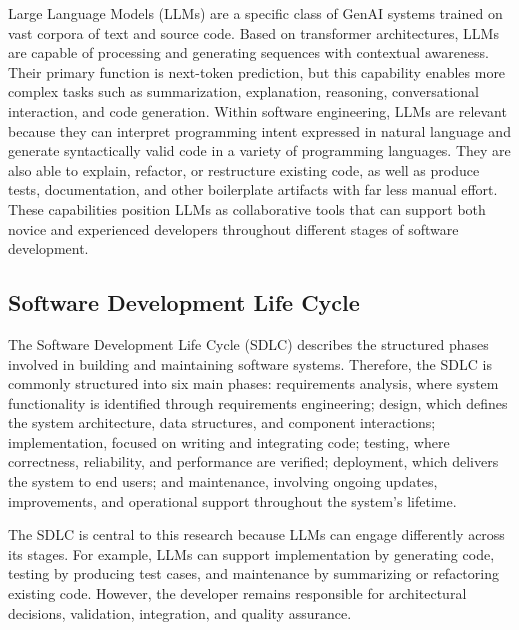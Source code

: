 Large Language Models (LLMs) are a specific class of GenAI systems trained on vast corpora of text and source code. Based on transformer architectures, LLMs are capable of processing and generating sequences with contextual awareness. Their primary function is next-token prediction, but this capability enables more complex tasks such as summarization, explanation, reasoning, conversational interaction, and code generation. Within software engineering, LLMs are relevant because they can interpret programming intent expressed in natural language and generate syntactically valid code in a variety of programming languages. They are also able to explain, refactor, or restructure existing code, as well as produce tests, documentation, and other boilerplate artifacts with far less manual effort. These capabilities position LLMs as collaborative tools that can support both novice and experienced developers throughout different stages of software development. \cite{Ahmed:2025ai,AlHashimi:2025er, Bai:2025ci, Banh:2025cf, Basha:2025tt, Chen:2025es, Dong:2024sc, Durrani:2024ad, Farhanna:2025eu, Gao:2025cc, Han:2025mg, Haque:2025la, Hemmat:2025rd, Hou:2025cl, J.Pries-Heje:2008SD, Jabrw:2025ss, Jensen:2025me, KarlovsKarlovskis:2024ga, Kim:2025ao, Kim:2025is, Li:2025sc, Moore:2025vc, Pendyala:2025pi, Qiu:2025ft, Ramos:2025aa, Terragni:2025fa, Tkachuk:2025dc, Wang:2025rs, Weyssow:2025ep, Yoo:2025sa, Zamfiroiu:2025ec, Zhang:2025ea}

\subsection{Software Development Life Cycle}

The Software Development Life Cycle (SDLC) describes the structured phases involved in building and maintaining software systems. Therefore, the SDLC is commonly structured into six main phases: requirements analysis, where system functionality is identified through requirements engineering; design, which defines the system architecture, data structures, and component interactions; implementation, focused on writing and integrating code; testing, where correctness, reliability, and performance are verified; deployment, which delivers the system to end users; and maintenance, involving ongoing updates, improvements, and operational support throughout the system’s lifetime.

The SDLC is central to this research because LLMs can engage differently across its stages. For example, LLMs can support implementation by generating code, testing by producing test cases, and maintenance by summarizing or refactoring existing code. However, the developer remains responsible for architectural decisions, validation, integration, and quality assurance.

